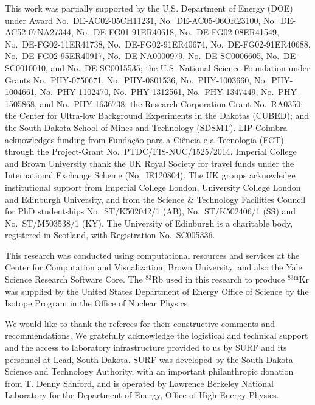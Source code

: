\documentclass[11pt,a4paper]{article}
\begin{document}
\begin{acknowledgments}
This work was partially supported by the U.S. Department of Energy (DOE) under Award No.~DE-AC02-05CH11231, No.~DE-AC05-06OR23100, No.~DE-AC52-07NA27344, No.~DE-FG01-91ER40618, No.~DE-FG02-08ER41549, No.~DE-FG02-11ER41738, No.~DE-FG02-91ER40674, No.~DE-FG02-91ER40688, No.~DE-FG02-95ER40917, No.~DE-NA0000979, No.~DE-SC0006605, No.~DE-SC0010010, and No.~DE-SC0015535; the U.S. National Science Foundation under Grants No.~PHY-0750671, No.~PHY-0801536, No.~PHY-1003660, No.~PHY-1004661, No.~PHY-1102470, No.~PHY-1312561, No.~PHY-1347449, No.~PHY-1505868, and No.~PHY-1636738; the Research Corporation Grant No.~RA0350; the Center for Ultra-low Background Experiments in the Dakotas (CUBED); and the South Dakota School of Mines and Technology (SDSMT). LIP-Coimbra acknowledges funding from Funda\c{c}\~{a}o para a Ci\^{e}ncia e a Tecnologia (FCT) through the Project-Grant No.~PTDC/FIS-NUC/1525/2014. Imperial College and Brown University thank the UK Royal Society for travel funds under the International Exchange Scheme (No.~IE120804). The UK groups acknowledge institutional support from Imperial College London, University College London and Edinburgh University, and from the Science \& Technology Facilities Council for PhD studentships No.~ST/K502042/1 (AB), No.~ST/K502406/1 (SS) and No.~ST/M503538/1 (KY). The University of Edinburgh is a charitable body, registered in Scotland, with Registration No.~SC005336.

This research was conducted using computational resources and services at the Center for Computation and Visualization, Brown University, and also the Yale Science Research Software Core. The $^{83}$Rb used in this research to produce $^{83\mathrm{m}}$Kr was supplied by the United States Department of Energy Office of Science by the Isotope Program in the Office of Nuclear Physics.

We would like to thank the referees for their constructive comments and recommendations. We gratefully acknowledge the logistical and technical support and the access to laboratory infrastructure provided to us by SURF and its personnel at Lead, South Dakota. SURF was developed by the South Dakota Science and Technology Authority, with an important philanthropic donation from T. Denny Sanford, and is operated by Lawrence Berkeley National Laboratory for the Department of Energy, Office of High Energy Physics.

\end{acknowledgments}



%
\end{document}
